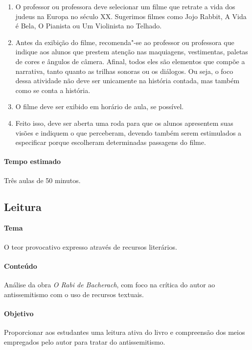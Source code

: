 \documentclass[12pt]{extarticle}
\begin{document}
\begin{enumerate}

\item O professor ou professora deve selecionar um filme que retrate a vida dos judeus na Europa no século XX. Sugerimos filmes como Jojo Rabbit, A Vida é Bela, O Pianista ou Um Violinista no Telhado. 

\item Antes da exibição do filme, recomenda"-se ao
professor ou professora que indique aos alunos que prestem atenção nas maquiagens,
vestimentas, paletas de cores e ângulos de câmera. Afinal, todos eles
são elementos que compõe a narrativa, tanto quanto as trilhas sonoras ou
os diálogos. Ou seja, o foco dessa atividade não deve ser unicamente na
história contada, mas também como se conta a história.

\item O filme deve ser exibido em horário de aula, se possível.

\item Feito isso, deve ser aberta uma roda para que os alunos
apresentem suas visões e indiquem o que perceberam, devendo também serem
estimulados a especificar porque escolheram determinadas
passagens do filme.

\end{enumerate}

\paragraph{Tempo estimado} Três aulas de 50 minutos.


\subsection{Leitura}


\paragraph{Tema} O teor provocativo expresso através de recursos literários.

\paragraph{Conteúdo} Análise da obra \emph{O Rabi de Bacherach}, 
com foco na crítica do autor ao antissemitismo com o uso de recursos textuais.

\paragraph{Objetivo} Proporcionar aos estudantes uma leitura ativa do livro
e compreensão dos meios empregados pelo autor para tratar do antissemitismo.
\end{document}
